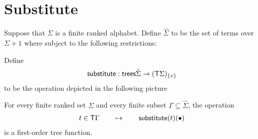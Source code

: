 \section{Substitute}
Suppose that $\Sigma$ is a finite ranked alphabet. Define $\hat \Sigma$ to be the set of terms over $\Sigma + 1$ where subject to the following restrictions:

Define 
\begin{align*}
    \mathsf{substitute} : \mathsf {trees} \hat \Sigma \to (\mathsf T \Sigma)_{\{x\}}
\end{align*}
to be the operation  depicted in the following picture

 
\begin{lemma}\label{lem:substitute}
    For every finite ranked set $\Sigma$ and every finite subset $\Gamma \subseteq \hat \Sigma$, the operation
    \begin{align*}
        t \in \mathsf T \Gamma \qquad \mapsto \qquad \mathsf{substitute}(t)(\bullet)
    \end{align*}
     is a first-order tree function.
\end{lemma}
 